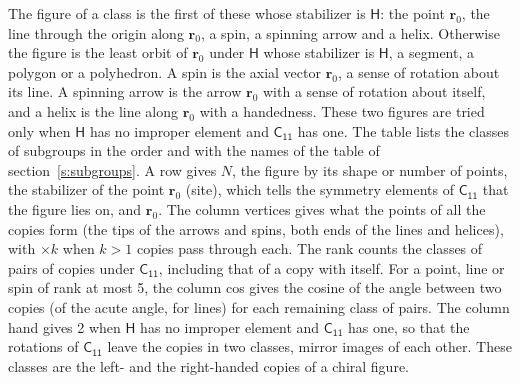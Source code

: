 \documentclass[10pt,a4paper]{article}
\numberwithin{equation}{section}
\newcommand{\grp}[1]{\mathsf{#1}}
\newcommand{\pointr}{\mathbf{r}}
\begin{document}
\leavevmode\label{n:head.figure}The figure of a class is the first of these whose stabilizer is $\grp{H}$: the point $\pointr_0$, the line through the origin along $\pointr_0$, a spin, a spinning arrow and a helix. Otherwise the figure is the least orbit of $\pointr_0$ under $\grp{H}$ whose stabilizer is $\grp{H}$, a segment, a polygon or a polyhedron. A spin is the axial vector $\pointr_0$, a sense of rotation about its line. A spinning arrow is the arrow $\pointr_0$ with a sense of rotation about itself, and a helix is the line along $\pointr_0$ with a handedness. These two figures are tried only when $\grp{H}$ has no improper element and $\grp{C_{11}}$ has one. The table lists the classes of subgroups in the order and with the names of the table of section~\ref{s:subgroups}. \label{n:head.site}A row gives $N$, the figure by its shape or number of points, the stabilizer of the point $\pointr_0$ (site), which tells the symmetry elements of $\grp{C_{11}}$ that the figure lies on, and $\pointr_0$. \label{n:head.vertices}The column vertices gives what the points of all the copies form (the tips of the arrows and spins, both ends of the lines and helices), with ${\times}k$ when $k > 1$ copies pass through each. \label{n:head.rank}The rank counts the classes of pairs of copies under $\grp{C_{11}}$, including that of a copy with itself. \label{n:head.cos}For a point, line or spin of rank at most 5, the column cos gives the cosine of the angle between two copies (of the acute angle, for lines) for each remaining class of pairs. \label{n:head.hand}The column hand gives 2 when $\grp{H}$ has no improper element and $\grp{C_{11}}$ has one, so that the rotations of $\grp{C_{11}}$ leave the copies in two classes, mirror images of each other. These classes are the left- and the right-handed copies of a chiral figure.
\end{document}
